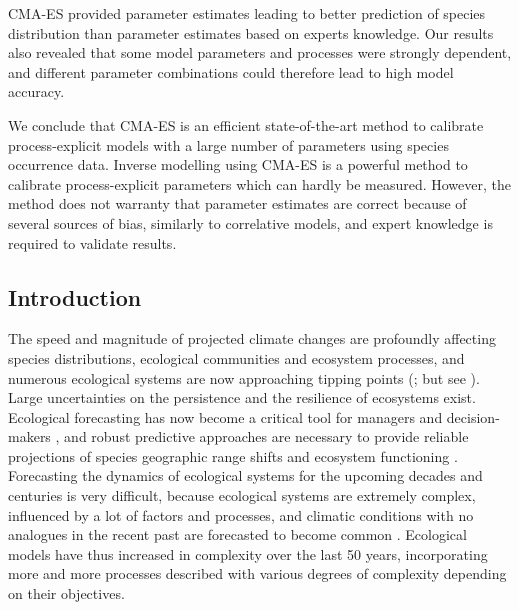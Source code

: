 CMA-ES provided parameter estimates leading to better prediction of
species distribution than parameter estimates based on experts
knowledge. Our results also revealed that some model parameters and
processes were strongly dependent, and different parameter
combinations could therefore lead to high model accuracy.

We conclude that CMA-ES is an efficient state-of-the-art method to
calibrate process-explicit models with a large number of parameters using
species occurrence data. Inverse modelling using CMA-ES is a powerful
method to calibrate process-explicit parameters which can hardly be
measured. However, the method does not warranty that parameter
estimates are correct because of several sources of bias, similarly to
correlative models, and expert knowledge is required to validate
results.

\rmfamily

\newpage

\subsection{Introduction}\label{introduction}

The speed and magnitude of projected climate changes are profoundly
affecting species distributions, ecological communities and ecosystem
processes, and numerous ecological systems are now approaching tipping
points (\citealp{Lenton2008, Barnosky2012, Steffen2018}; but see
\citealp{Brook2013}). Large
uncertainties on the persistence and the resilience of ecosystems exist.
Ecological forecasting has now become a critical tool for managers and
decision-makers \citep{Urban2015}, and
robust predictive approaches are necessary to provide reliable
projections of species geographic range shifts and ecosystem functioning
\citep{Mouquet2015}.
Forecasting the dynamics of ecological systems for the upcoming decades
and centuries is very difficult, because ecological systems are
extremely complex, influenced by a lot of factors and processes, and
climatic conditions with no analogues in the recent past are forecasted
to become common \citep{Williams2007, Radeloff2015, Fitzpatrick2018}. Ecological models have thus increased in complexity over the
last 50 years, incorporating more and more processes described with
various degrees of complexity depending on their objectives.


